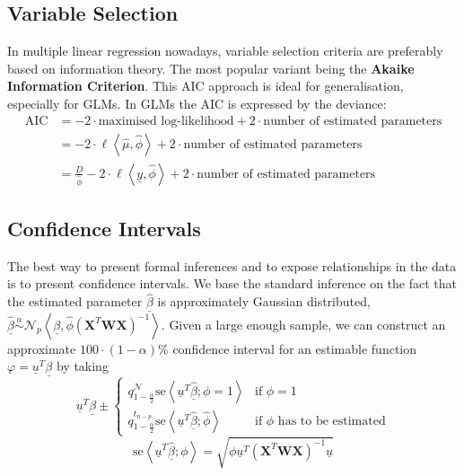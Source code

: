 \documentclass[11pt]{article}
\begin{document}
\subsection{Variable Selection}
In multiple linear regression nowadays, variable selection criteria are preferably based on information theory. The most popular variant being the \textbf{Akaike Information Criterion}. This AIC approach is ideal for generalisation, especially for GLMs. In GLMs the AIC is expressed by the deviance:
\begin{align*}
	\text{AIC} &= -2\cdot\text{maximised log-likelihood} + 2\cdot\text{number of estimated parameters}\\
	&= -2\cdot\ell\left\langle \widehat{\mu}, \widehat{\phi} \right\rangle + 2\cdot\text{number of estimated parameters}\\
	&= \frac{D}{\widehat{\phi}} - 2\cdot\ell\left\langle \underline{y}, \widehat{\phi} \right\rangle + 2\cdot\text{number of estimated parameters}
\end{align*}

\subsection{Confidence Intervals}

The best way to present formal inferences and to expose relationships in the data is to present confidence intervals. We base the standard inference on the fact that the estimated parameter $\underline{\widehat{\beta}}$ is approximately Gaussian distributed, $\underline{\widehat{\beta}} \overset{a}{\sim} \mathcal{N}_p\left\langle \underline{\beta},\widehat{\phi}\left(\textbf{X}^T\textbf{W}\textbf{X}\right)^{-1} \right\rangle $. Given a large enough sample, we can construct an approximate $100\cdot(1-\alpha)\%$ confidence interval for an estimable function $\varphi = \underline{u}^T\underline{\beta}$ by taking
\begin{equation*}
	\underline{u}^T\underline{\beta} \pm \left\{ \begin{matrix}
		q_{1-\frac{\alpha}{2}}^{\mathcal{N}} \text{se}\left\langle \underline{u}^T\underline{\widehat{\beta}};\phi=1 \right\rangle & \text{if }\phi=1\\
		q_{1-\frac{\alpha}{2}}^{t_{n-p}} \text{se}\left\langle \underline{u}^T\underline{\widehat{\beta}};\widehat{\phi} \right\rangle & \text{if }\phi\text{ has to be estimated}
	\end{matrix} \right.
\end{equation*}
\begin{equation*}
	\text{se}\left\langle \underline{u}^T\underline{\widehat{\beta}};\phi \right\rangle = \sqrt{\phi\underline{u}^T (\textbf{X}^T\textbf{W}\textbf{X})^{-1}\underline{u}}
\end{equation*}
\end{document}
